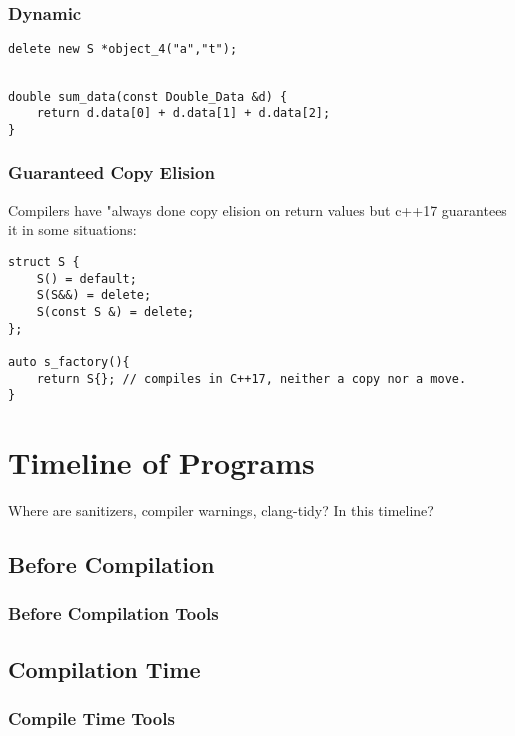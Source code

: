 \subsection{Dynamic}

\begin{verbatim}
delete new S *object_4("a","t");
\end{verbatim}


\begin{verbatim}

double sum_data(const Double_Data &d) {
    return d.data[0] + d.data[1] + d.data[2];
}
\end{verbatim}

\subsection{Guaranteed Copy Elision}

Compilers have "always done copy elision on return values but c++17 guarantees it in some situations:

\begin{verbatim}
struct S {
    S() = default;
    S(S&&) = delete;
    S(const S &) = delete;
};

auto s_factory(){
    return S{}; // compiles in C++17, neither a copy nor a move.
}
\end{verbatim}

\chapter{Timeline of Programs}

Where are sanitizers, compiler warnings, clang-tidy? In this timeline?

\section{Before Compilation}

\subsection{Before Compilation Tools}

\section{Compilation Time}

\subsection{Compile Time Tools}


